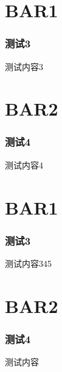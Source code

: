 \documentclass{ctexbeamer}
\begin{document}
    

    \section{BAR1}

    \begin{frame}
        \frametitle{测试3}
    
        测试内容3
    
    \end{frame}

    \section{BAR2}

    \begin{frame}
        \frametitle{测试4}

        测试内容4
    \end{frame}

    

    \section{BAR1}

    \begin{frame}
        \frametitle{测试3}
    
        测试内容345
    
    \end{frame}

    \section{BAR2}

    \begin{frame}
        \frametitle{测试4}

        测试内容
    \end{frame}
\end{document}
